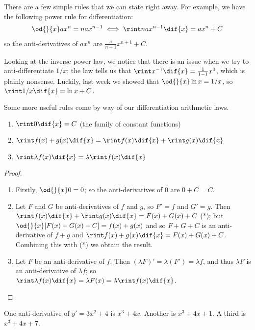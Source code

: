 There are a few simple rules that we can state right away. For example, we have the following power
rule for differentiation:
\begin{displaymath}
  \od{}{x} ax^n = nax^{n - 1} \iff \rint nax^{n - 1} \dif{x} = ax^n + C
\end{displaymath}
so the anti-derivatives of $ ax^n $ are $ \frac{a}{n + 1} x^{n + 1} + C $.

Looking at the inverse power law, we notice that there is an issue when we try to anti-differentiate
$ 1/x $; the law tells us that $ \rint x^{-1} \dif{x} = \frac{1}{1 - 1} x^{0} $, which is plainly nonsense. Luckily,
last week we showed that $ \od{}{x} \ln x = 1/x $, so $ \rint 1/x \dif{x} = \ln x + C $.

Some more useful rules come by way of our differentiation arithmetic laws.
\begin{thm}
  \begin{enumerate}
    \item $ \rint 0 \dif{x} = C $ (the family of constant functions)
    \item $ \rint f(x) + g(x) \dif{x} = \rint f(x) \dif{x} + \rint g(x) \dif{x} $
    \item $ \rint \lambda f(x) \dif{x} = \lambda \rint f(x) \dif{x} $
  \end{enumerate}
\end{thm}
\begin{proof}
  \begin{enumerate}
    \item Firstly, $ \od{}{x} 0 = 0 $; so the anti-derivatives of $ 0 $ are $ 0 + C = C $.
    \item Let $ F $ and $ G $ be anti-derivatives of $ f $ and $ g $, so $ F' = f $ and $ G' = g $.
          Then $ \rint f(x) \dif{x} + \rint g(x) \dif{x} = F(x) + G(x) + C $ (*); but $ \od{}{x} [F(x) + G(x) + C] = f(x) + g(x) $
          and so $ F + G + C $ is an anti-derivative of $ f + g $ and $ \rint f(x) + g(x) \dif{x} = F(x) + G(x) + C $. Combining
          this with (*) we obtain the result.
    \item Let $ F $ be an anti-derivative of $ f $. Then $ (\lambda F)' = \lambda (F') = \lambda f $, and thus $ \lambda F $ is
          an anti-derivative of $ \lambda f $; so $ \rint \lambda f(x) \dif{x} = \lambda F(x) = \lambda \rint f(x) \dif{x} $.
  \end{enumerate}
\end{proof}

\begin{ex}
  One anti-derivative of $ y' = 3x^2 + 4 $ is $ x^3 + 4x $. Another is $ x^3 + 4x + 1 $. A third is $ x^3 + 4x + 7 $.
\end{ex}

